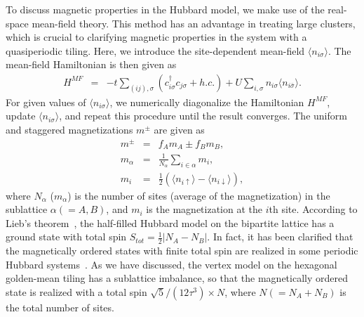 \documentclass[aps,twocolumn,pra,superscriptaddress,amsmath,amssymb]{revtex4-1}
\begin{document}
To discuss magnetic properties in the Hubbard model,
we make use of the real-space mean-field theory.
This method has an advantage in treating large clusters,
which is crucial to clarifying magnetic properties in the system with a quasiperiodic tiling.
Here, we introduce the site-dependent mean-field $\langle n_{i\sigma}\rangle$.
The mean-field Hamiltonian is then given as
\begin{eqnarray}
  H^{MF}&=&-t\sum_{(ij),\sigma}\left(c_{i\sigma}^\dag c_{j\sigma}+h.c.\right)
  +U\sum_{i,\sigma} n_{i\sigma}\langle n_{i\bar{\sigma}}\rangle.\label{H}
\end{eqnarray}
For given values of $\langle n_{i\sigma}\rangle$,
we numerically diagonalize the Hamiltonian $H^{MF}$, update
$\langle n_{i\sigma}\rangle$, and repeat this procedure until the result
converges.
The uniform and staggered magnetizations $m^\pm$ are given as
\begin{eqnarray}
  m^\pm &=&f_A m_A \pm f_B m_B,\\
  m_{\alpha}&=&\frac{1}{N_{\alpha}}\sum_{i\in \alpha} m_i,\\
  m_i&=&\frac{1}{2}\left( \langle n_{i\uparrow} \rangle
  -\langle n_{i\downarrow} \rangle\right),
\end{eqnarray}
where $N_\alpha$ ($m_\alpha$) is the number of sites
(average of the magnetization) in the sublattice $\alpha(=A, B)$,
and $m_i$ is the magnetization at the $i$th site.
According to Lieb's theorem~\cite{Lieb},
the half-filled Hubbard model on the bipartite lattice
has a ground state with
total spin $S_{tot} =\frac{1}{2}|N_A-N_B|$.
In fact, it has been clarified that
the magnetically ordered states with finite total spin
are realized in some periodic Hubbard systems~\cite{Lieb,Mielke,Tasaki,Kusakabe,Noda}.
As we have discussed, the vertex model on the hexagonal golden-mean tiling has
a sublattice imbalance, so that
the magnetically ordered state is realized with
a total spin $\sqrt{5}/(12\tau^3)\times N$,
where $N(=N_A+N_B)$ is the total number of sites.
\end{document}
